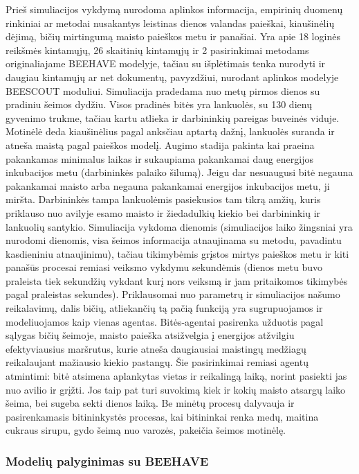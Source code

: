 \documentclass{VUMIFPSmagistrinis}
\begin{document}
Prieš simuliacijos vykdymą nurodoma aplinkos informacija, empirinių duomenų rinkiniai ar metodai nusakantys leistinas dienos valandas paieškai, kiaušinėlių dėjimą, bičių mirtingumą maisto paieškos metu ir panašiai. Yra apie 18 loginės reikšmės kintamųjų, 26 skaitinių kintamųjų ir 2 pasirinkimai metodams originaliajame BEEHAVE modelyje, tačiau su išplėtimais tenka nurodyti ir daugiau kintamųjų ar net dokumentų, pavyzdžiui, nurodant aplinkos modelyje BEESCOUT moduliui.
Simuliacija pradedama nuo metų pirmos dienos su pradiniu šeimos dydžiu. Visos pradinės bitės yra lankuolės, su 130 dienų gyvenimo trukme, tačiau kartu atlieka ir darbininkių pareigas buveinės viduje. Motinėlė deda kiaušinėlius pagal anksčiau aptartą dažnį, lankuolės suranda ir atneša maistą pagal paieškos modelį.  
Augimo stadija pakinta kai praeina pakankamas minimalus laikas ir sukaupiama pakankamai daug energijos inkubacijos metu (darbininkės palaiko šilumą). Jeigu dar nesuaugusi bitė negauna pakankamai maisto arba negauna pakankamai energijos inkubacijos metu, ji miršta.
Darbininkės tampa lankuolėmis pasiekusios tam tikrą amžių, kuris priklauso nuo avilyje esamo maisto ir žiedadulkių  kiekio bei darbininkių ir lankuolių santykio. 
Simuliacija vykdoma dienomis (simuliacijos laiko žingsniai yra nurodomi dienomis, visa šeimos informacija atnaujinama su metodu, pavadintu kasdieniniu atnaujinimu), tačiau tikimybėmis grįstos mirtys paieškos metu ir kiti panašūs procesai remiasi veiksmo vykdymu sekundėmis (dienos metu buvo praleista tiek sekundžių vykdant kurį nors veiksmą ir jam pritaikomos tikimybės pagal praleistas sekundes). 
Priklausomai nuo parametrų ir simuliacijos našumo reikalavimų, dalis bičių, atliekančių tą pačią funkciją yra sugrupuojamos ir modeliuojamos kaip vienas agentas. Bitės-agentai pasirenka užduotis pagal sąlygas bičių šeimoje, maisto paieška atsižvelgia į energijos atžvilgiu efektyviausius maršrutus, kurie atneša daugiausiai maistingų medžiagų reikalaujant mažiausio kiekio pastangų. Šie pasirinkimai remiasi agentų atmintimi: bitė atsimena aplankytas vietas ir reikalingą laiką, norint pasiekti jas nuo avilio ir grįžti. Jos taip pat turi suvokimą kiek ir kokių maisto atsargų laiko šeima, bei sugeba sekti dienos laiką.
Be minėtų procesų dalyvauja ir pasirenkamasis bitininkystės procesas, kai bitininkai renka medų, maitina cukraus sirupu, gydo šeimą nuo varozės, pakeičia šeimos motinėlę. 



\subsubsection{Modelių palyginimas su BEEHAVE}
\end{document}

